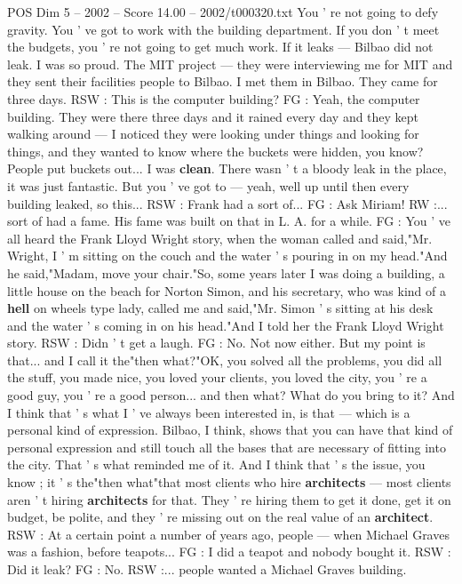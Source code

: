 \begin{textsample}{POS Dim 5 – 2002 – Score 14.00 – 2002/t000320.txt}
You ' re not going to defy gravity.
You ' ve got to work with the building department.
If you don ' t meet the budgets, you ' re not going to get much work.
If it leaks — Bilbao did not leak.
I was so proud.
The MIT project — they were interviewing me for MIT and they sent their facilities people to Bilbao.
I met them in Bilbao.
They came for three days.
RSW : This is the computer building?
FG : Yeah, the computer building.
They were there three days and it rained every day and they kept walking around — I noticed they were looking under things and looking for things, and they wanted to know where the buckets were hidden, you know?
People put buckets out...
I was \textbf{clean}.
There wasn ' t a bloody leak in the place, it was just fantastic.
But you ' ve got to — yeah, well up until then every building leaked, so this...
RSW : Frank had a sort of...
FG : Ask Miriam!
RW :... sort of had a fame.
His fame was built on that in L.
A. for a while.
FG : You ' ve all heard the Frank Lloyd Wright story, when the woman called and said,"Mr.
Wright, I ' m sitting on the couch and the water ' s pouring in on my head."And he said,"Madam, move your chair."So, some years later I was doing a building, a little house on the beach for Norton Simon, and his secretary, who was kind of a \textbf{hell} on wheels type lady, called me and said,"Mr.
Simon ' s sitting at his desk and the water ' s coming in on his head."And I told her the Frank Lloyd Wright story.
RSW : Didn ' t get a laugh.
FG : No.
Not now either.
But my point is that... and I call it the"then what?"OK, you solved all the problems, you did all the stuff, you made nice, you loved your clients, you loved the city, you ' re a good guy, you ' re a good person... and then what?
What do you bring to it?
And I think that ' s what I ' ve always been interested in, is that — which is a personal kind of expression.
Bilbao, I think, shows that you can have that kind of personal expression and still touch all the bases that are necessary of fitting into the city.
That ' s what reminded me of it.
And I think that ' s the issue, you know ; it ' s the"then what"that most clients who hire \textbf{architects} — most clients aren ' t hiring \textbf{architects} for that.
They ' re hiring them to get it done, get it on budget, be polite, and they ' re missing out on the real value of an \textbf{architect}.
RSW : At a certain point a number of years ago, people — when Michael Graves was a fashion, before teapots...
FG : I did a teapot and nobody bought it.
RSW : Did it leak?
FG : No.
RSW :... people wanted a Michael Graves building.

\end{textsample}

